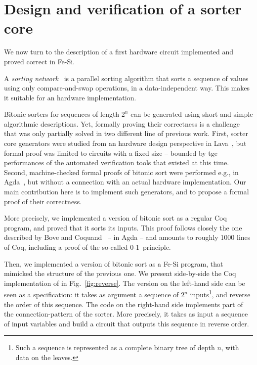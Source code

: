 \documentclass{llncs}
\begin{document}
\section{Design and verification of a sorter core}
We now turn to the description of a first hardware circuit implemented
and proved correct in Fe-Si. 

A \emph{sorting network}~\cite{DBLP:books/mg/CormenLRS01} is a
parallel sorting algorithm that sorts a sequence of values using only
compare-and-swap operations, in a data-independent way. This makes it
suitable for an hardware implementation.

Bitonic sorters for sequences of length $2^n$ can be generated using
short and simple algorithmic descriptions. Yet, formally proving their
correctness is a challenge that was only partially solved in two
different line of previous work.
%
First, sorter core generators were studied from an hardware design
perspective in Lava~\cite{DBLP:conf/charme/ClaessenSS01}, but formal
proof was limited to circuits with a fixed size -- bounded by tge
performances of the automated verification tools that existed at this
time.
%
Second, machine-checked formal proofs of bitonic sort were performed
e.g., in Agda~\cite{DBLP:conf/types/BoveC04}, but without a
connection with an actual hardware implementation. 
%
Our main contribution here is to implement such generators, and to
propose a formal proof of their correctness.

More precisely, we implemented a version of bitonic sort as a regular
Coq program, and proved that it sorts its inputs. This proof follows
closely the one described by Bove and
Coquand~\cite{DBLP:conf/types/BoveC04} -- in Agda -- and amounts to
roughly 1000 lines of Coq, including a proof of the so-called
\mbox{0-1~principle}.

Then, we implemented a version of bitonic sort as a Fe-Si program,
that mimicked the structure of the previous one. We present
side-by-side the Coq implementation of  in
Fig.~\ref{fig:reverse}.
%
The version on the left-hand side can be seen as a specification: it
takes as argument a sequence of $2^n$ inputs\footnote{Such a sequence
  is represented as a complete binary tree of depth $n$, with data on
  the leaves.}, and reverse the order of this sequence.
%
The code on the right-hand side implements part of the
connection-pattern of the sorter. More precisely, it takes as input a
sequence of input variables and build a circuit that outputs this
sequence in reverse order. 
\end{document}
